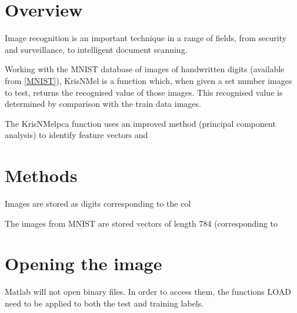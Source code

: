 \documentclass[12pt]{article}
\begin{document}
\section{Overview}

Image recognition is an important technique in a range of fields, from security and surveillance, to intelligent document scanning. 

Working with the MNIST database of images of handwritten digits (available from \ref{MNIST}), KrisNMel is a function which, when given a set number images to test, returns the recognised value of those images. This recognised value is determined by comparison with the train data images. 

The KrisNMelpca function uses an improved method (principal component analysis) to identify feature vectors and 

\section{Methods}

Images are stored as digits corresponding to the col

The images from MNIST are stored vectors of length 784 (corresponding to 

\section{Opening the image}

Matlab will not open binary files. In order to access them, the functions LOAD need to be applied to both the test and training labels.\citep{ahu61}



\end{document}
